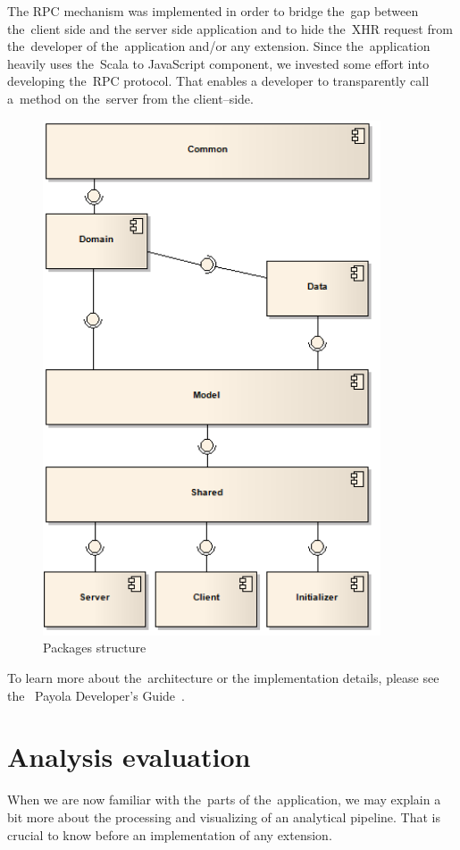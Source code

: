 The RPC mechanism was implemented in order to bridge the~gap between the~client 
side and the server side application and to hide the~XHR request from
the~developer of the~application and/or any extension. Since the~application heavily
uses the~Scala to JavaScript component, we invested some effort into developing the~RPC 
protocol. That enables a developer to transparently call a~method on the~server from 
the client--side. 

\begin{figure}
	\centering
	\includegraphics[width=100mm]{images/project_dependencies.png}
	\caption{Packages structure}
	\label{fig:packages-structure}
\end{figure}

To learn more about the~architecture or the implementation details, please see the~
Payola Developer's Guide~\cite{payola:dg}.

\section{Analysis evaluation}
When we are now familiar with the~parts of the~application, we may explain a~
bit more about the processing and visualizing of an analytical pipeline. That is 
crucial to know before an implementation of any extension.


